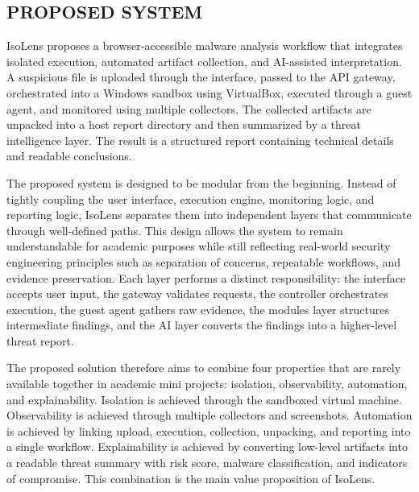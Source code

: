 \documentclass[a4paper,12pt,oneside]{report}
\begin{document}
\subsection{PROPOSED SYSTEM}
IsoLens proposes a browser-accessible malware analysis workflow that integrates isolated execution, automated artifact collection, and AI-assisted interpretation. A suspicious file is uploaded through the interface, passed to the API gateway, orchestrated into a Windows sandbox using VirtualBox, executed through a guest agent, and monitored using multiple collectors. The collected artifacts are unpacked into a host report directory and then summarized by a threat intelligence layer. The result is a structured report containing technical details and readable conclusions.

\par

\par

The proposed system is designed to be modular from the beginning. Instead of tightly coupling the user interface, execution engine, monitoring logic, and reporting logic, IsoLens separates them into independent layers that communicate through well-defined paths. This design allows the system to remain understandable for academic purposes while still reflecting real-world security engineering principles such as separation of concerns, repeatable workflows, and evidence preservation. Each layer performs a distinct responsibility: the interface accepts user input, the gateway validates requests, the controller orchestrates execution, the guest agent gathers raw evidence, the modules layer structures intermediate findings, and the AI layer converts the findings into a higher-level threat report.

\par

\par

The proposed solution therefore aims to combine four properties that are rarely available together in academic mini projects: isolation, observability, automation, and explainability. Isolation is achieved through the sandboxed virtual machine. Observability is achieved through multiple collectors and screenshots. Automation is achieved by linking upload, execution, collection, unpacking, and reporting into a single workflow. Explainability is achieved by converting low-level artifacts into a readable threat summary with risk score, malware classification, and indicators of compromise. This combination is the main value proposition of IsoLens.
\end{document}
